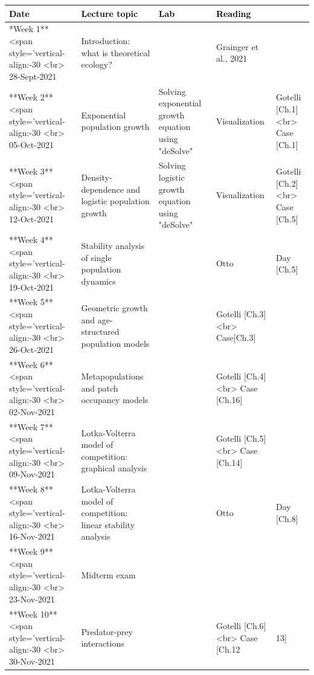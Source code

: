 \documentclass[
]{book}
\begin{document}
\begin{tabu} to 
\hline
\begingroup\fontsize{20}{22}\selectfont \textcolor{black}{\textbf{Date}}\endgroup & \begingroup\fontsize{20}{22}\selectfont \textcolor{black}{\textbf{Lecture topic}}\endgroup & \begingroup\fontsize{20}{22}\selectfont \textcolor{black}{\textbf{Lab}}\endgroup & \begingroup\fontsize{20}{22}\selectfont \textcolor{black}{\textbf{Reading}}\endgroup\\
\hline
**Week 1** <span style='vertical-align:-30%
           <br> 28-Sept-2021 & Introduction: what is theoretical ecology? &  & Grainger et al., 2021\\
\hline
**Week 2** <span style='vertical-align:-30%
           <br> 05-Oct-2021 & Exponential population growth & Solving exponential growth equation using "deSolve" & Visualization & Gotelli [Ch.1] <br> Case [Ch.1]\\
\hline
**Week 3** <span style='vertical-align:-30%
           <br> 12-Oct-2021 & Density-dependence and logistic population growth & Solving logistic growth equation using "deSolve" & Visualization & Gotelli [Ch.2] <br> Case [Ch.5]\\
\hline
**Week 4** <span style='vertical-align:-30%
           <br> 19-Oct-2021 & Stability analysis of single population dynamics &  & Otto & Day [Ch.5]\\
\hline
**Week 5** <span style='vertical-align:-30%
           <br> 26-Oct-2021 & Geometric growth and age-structured population models &  & Gotelli [Ch.3] <br> Case[Ch.3]\\
\hline
**Week 6** <span style='vertical-align:-30%
           <br> 02-Nov-2021 & Metapopulations and patch occupancy models &  & Gotelli [Ch.4] <br> Case [Ch.16]\\
\hline
**Week 7** <span style='vertical-align:-30%
           <br> 09-Nov-2021 & Lotka-Volterra model of competition: graphical analysis &  & Gotelli [Ch.5] <br> Case [Ch.14]\\
\hline
**Week 8** <span style='vertical-align:-30%
           <br> 16-Nov-2021 & Lotka-Volterra model of competition: linear stability analysis &  & Otto & Day [Ch.8]\\
\hline
**Week 9** <span style='vertical-align:-30%
           <br> 23-Nov-2021 & Midterm exam &  & \\
\hline
**Week 10** <span style='vertical-align:-30%
           <br> 30-Nov-2021 & Predator-prey interactions &  & Gotelli [Ch.6] <br> Case [Ch.12 & 13]\\

\end{tabu}
\end{document}

